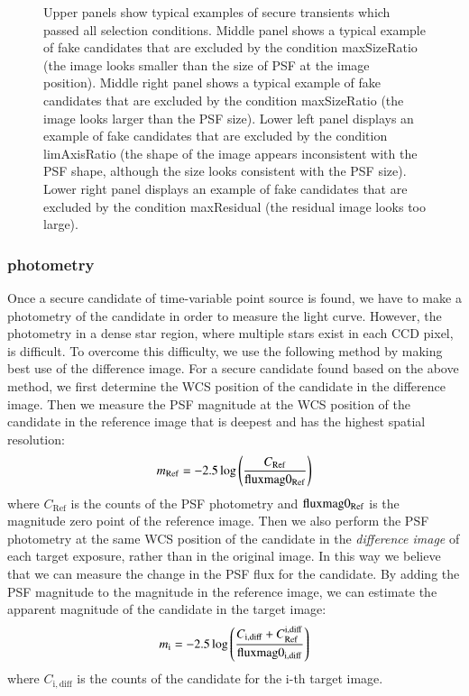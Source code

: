\documentclass[iop, apj]{emulateapj}
\newcommand{\?}{\stackrel{?}{=}}
\begin{document}
\begin{figure}[t]
{{Upper panels show typical examples of secure transients which passed all selection conditions. 
Middle panel shows a typical example of fake candidates that are excluded by the condition maxSizeRatio (the image looks smaller than the size of PSF at the image position). 
Middle right panel shows a typical example of fake candidates that are excluded by the condition maxSizeRatio (the image looks larger than the PSF size). 
Lower left panel displays an example of fake candidates that are excluded by the condition limAxisRatio (the shape of the image appears inconsistent with the PSF shape, although the size looks consistent with the PSF size). 
Lower right panel displays an example of fake candidates that are excluded by the condition maxResidual (the residual image looks too large). 
}}
\label{fig:unlikes}
\end{figure}



\subsubsection{photometry}
\label{sec:photometh}
Once a secure candidate of time-variable point source is found, we have to make a photometry of the candidate in order to measure the light curve. However, the photometry in a dense star region, where multiple stars exist in each CCD pixel, is difficult. To overcome this difficulty, we use the following method by making best use of the difference image. 
For a secure candidate found based on the above method, we first determine the WCS position of the candidate in the difference image. Then we measure the PSF magnitude at the WCS position of the candidate in the reference image that is deepest and has the highest spatial resolution: 
%
\begin{eqnarray}
m_{\rm Ref}=-2.5\log\left(\frac{C_\mathrm{Ref}}{\rm{fluxmag}0_{\rm Ref}}\right)
\end{eqnarray}
%
where $C_\mathrm{Ref}$ is the counts of the PSF photometry and $\rm{fluxmag}0_{\rm Ref}$ is the magnitude zero point of the reference image. Then we also perform the PSF photometry at the same WCS position of the candidate in the {\it  difference image} of each target exposure, rather than in the original image. In this way we believe that we can measure the change in the PSF flux for the candidate. By adding the PSF magnitude to the magnitude in the reference image, we can estimate the apparent magnitude of the candidate in the target image:
%
\begin{eqnarray}
m_{\rm i}=-2.5\log\left(\frac{C_\mathrm{i,diff}+C^{\rm i,diff}_{\rm Ref}}{\rm{fluxmag}0_{\rm i,diff}}\right)
\end{eqnarray}
%
where $C_\mathrm{i,diff}$ is the counts of the candidate for the i-th target image. 
%
\end{document}
